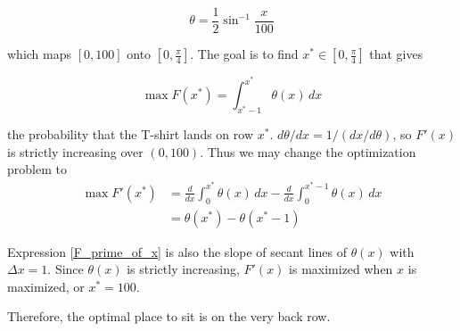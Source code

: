 \documentclass[]{article}
\begin{document}
\begin{equation}
\theta = \frac{1}{2} \sin^{-1} \frac{x}{100}
\end{equation}

\noindent which maps $[0, 100]$ onto $[0, \frac{\pi}{4}]$. The goal is to find $x^* \in [0, \frac{\pi}{4}]$ that gives

\begin{equation}\label{F_of_x}
\max F(x^*) = \int_{x^*-1}^{x^*} \theta(x)\, dx
\end{equation}

\noindent the probability that the T-shirt lands on row $x^*$. $d\theta/dx = 1/(dx/d\theta)$, so $F'(x)$ is strictly increasing over $(0, 100)$. Thus we may change the optimization problem to
\begin{align}
\max F'(x^*) &= \frac{d}{dx}\int_{0}^{x^*} \theta(x)\, dx - \frac{d}{dx}\int_{0}^{x^*-1}\theta(x)\, dx \nonumber\\
&= \theta(x^*) - \theta(x^*-1) \label{F_prime_of_x}
\end{align}

\noindent Expression \eqref{F_prime_of_x} is also the slope of secant lines of $\theta(x)$ with $\Delta x = 1$. Since $\theta(x)$ is strictly increasing, $F'(x)$ is maximized when $x$ is maximized, or $x^*=100$.

Therefore, the optimal place to sit is on the very back row.
\end{document}
